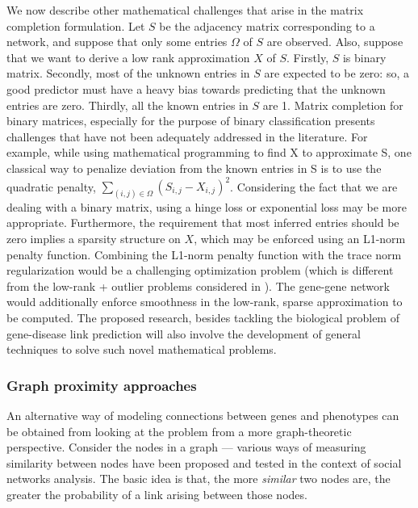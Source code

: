 We now describe other mathematical challenges that arise in the matrix completion formulation. Let $S$ be the adjacency matrix corresponding to a network, and suppose that only some entries $\Omega$ of $S$ are observed. Also, suppose that we want to derive a low rank approximation $X$ of $S$. Firstly, $S$ is binary matrix. Secondly, most of the unknown entries in $S$ are expected to be zero: so, a good predictor must have a heavy bias towards predicting that the unknown entries are zero. Thirdly, all the known entries in $S$ are 1. Matrix completion for binary matrices, especially for the purpose of binary classification presents challenges that have not been adequately addressed in the literature. For example, while using mathematical programming to find X to approximate S, one classical way to penalize deviation from the known entries in S is to use the quadratic penalty, $\sum_{(i, j) \in \Omega} (S_{i, j} - X_{i,j})^{2}$. Considering the fact that we are dealing with a binary matrix, using a hinge loss or exponential loss may be more appropriate. Furthermore, the requirement that most inferred entries should be zero implies a sparsity structure on $X$, which may be enforced using an L1-norm penalty function. Combining the L1-norm penalty function with the trace norm regularization would be a challenging optimization problem (which is different from the low-rank + outlier problems considered in \cite{SanghaviChandrasekaran,candesRPCA09}). The gene-gene network would additionally enforce smoothness in the low-rank, sparse approximation to be computed. The proposed research, besides tackling the biological problem of gene-disease link prediction will also involve the development of general techniques to solve such novel mathematical problems.

\subsubsection{Graph proximity approaches}
\label{section:graphProximityIntro}
An alternative way of modeling connections between genes and phenotypes can be obtained from looking at the problem from a more graph-theoretic perspective. Consider the nodes in a graph --- various ways of measuring similarity between nodes have been proposed and tested in the context of social networks analysis\cite{KleinbergLinkPred}. The basic idea is that, the more \textit{similar} two nodes are, the greater the probability of a link arising between those nodes.

